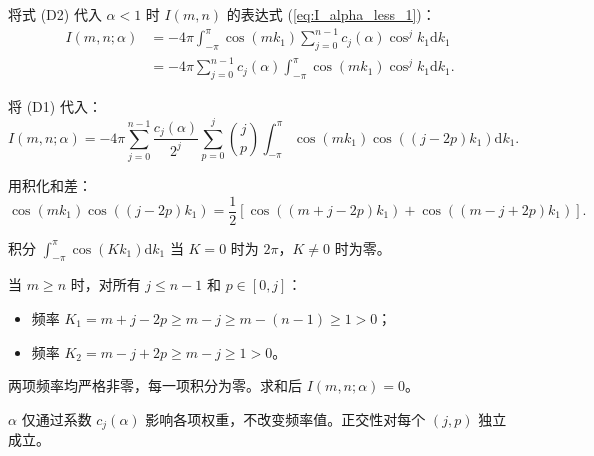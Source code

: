 \documentclass{article} %
\newcommand{\di}{\mathrm{d}}
\begin{document}
将式 (D2) 代入 $\alpha < 1$ 时 $I(m,n)$ 的表达式 (\ref{eq:I_alpha_less_1})：
\begin{align}
    I(m,n;\alpha) &= -4\pi\int_{-\pi}^{\pi}\cos(mk_1)\sum_{j=0}^{n-1} c_j(\alpha)\cos^j k_1 \di k_1 \nonumber\\
    &= -4\pi\sum_{j=0}^{n-1} c_j(\alpha)\int_{-\pi}^{\pi}\cos(mk_1)\cos^j k_1 \di k_1.
    \label{eq:D3}
\end{align}

将 (D1) 代入：
\begin{equation}
    I(m,n;\alpha) = -4\pi\sum_{j=0}^{n-1}\frac{c_j(\alpha)}{2^j}
    \sum_{p=0}^j \binom{j}{p}
    \int_{-\pi}^{\pi}\cos(mk_1)\cos((j-2p)k_1)\di k_1.
    \label{eq:D4}
\end{equation}

用积化和差：
\begin{equation}
    \cos(mk_1)\cos((j-2p)k_1) = \frac{1}{2}\left[\cos((m+j-2p)k_1) + \cos((m-j+2p)k_1)\right].
\end{equation}

积分 $\int_{-\pi}^{\pi}\cos(Kk_1)\di k_1$ 当 $K=0$ 时为 $2\pi$，$K\neq 0$ 时为零。

当 $m\ge n$ 时，对所有 $j\le n-1$ 和 $p\in[0,j]$：
\begin{itemize}
    \item 频率 $K_1 = m+j-2p \ge m-j \ge m-(n-1) \ge 1 > 0$；
    \item 频率 $K_2 = m-j+2p \ge m-j \ge 1 > 0$。
\end{itemize}
两项频率均严格非零，每一项积分为零。求和后 $I(m,n;\alpha)=0$。

$\alpha$ 仅通过系数 $c_j(\alpha)$ 影响各项权重，不改变频率值。正交性对每个 $(j,p)$ 独立成立。
\end{document}
